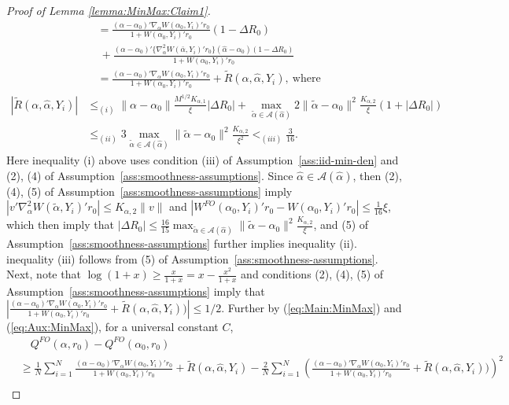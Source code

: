 \documentclass[11pt]{article}
\begin{document}
\begin{proof}[Proof of Lemma \ref{lemma:MinMax:Claim1}]
\begin{equation}
\begin{array}{rl}
&\displaystyle = \frac{(\alpha - \alpha_0)'\nabla_\alpha W(\alpha_0,Y_i)'r_0}{1+W(\alpha_0,Y_i)'r_0}(1-\Delta R_0) \\
&\ \displaystyle +\frac{(\alpha-\alpha_0)'\{\nabla_\alpha^2 W(\bar{\alpha},Y_i)'r_0\}(\hat\alpha-\alpha_0)(1-\Delta R_0)}{1+W(\alpha_0,Y_i)'r_0}\\
&\displaystyle = \frac{(\alpha - \alpha_0)'\nabla_\alpha W(\alpha_0,Y_i)'r_0}{1+W(\alpha_0,Y_i)'r_0} +\widetilde R(\alpha,\hat\alpha,Y_i),\ \mbox{where}
\end{array}
\end{equation}
$$\begin{array}{rl}
|\widetilde R(\alpha,\hat\alpha,Y_i)| &\displaystyle\leq_{(i)}  \|\alpha-\alpha_0\| \frac{M^{1/2}K_{\alpha,1}}{\xi} |\Delta R_0| +\max_{\tilde\alpha \in \mathcal{A}(\hat\alpha)} 2\|\tilde\alpha-\alpha_0\|^2 \frac{K_{\alpha,2}}{\xi} (1+|\Delta R_0|)\\
&\displaystyle\leq_{(ii)} 3\max_{\tilde\alpha \in \mathcal{A}(\hat\alpha)} \|\tilde\alpha-\alpha_0\|^2 \frac{K_{\alpha,2}}{\xi^2}<_{(iii)}\frac{3}{16}.
\end{array}$$
Here inequality (i) above uses condition (iii) of Assumption~\ref{ass:iid-min-den} and (2), (4) of Assumption~\ref{ass:smoothness-assumptions}. Since $\hat{\alpha}\in\mathcal{A}(\hat{\alpha})$, then (2), (4), (5) of Assumption~\ref{ass:smoothness-assumptions} imply $|v'\nabla_\alpha^2 W(\tilde\alpha,Y_i)'r_0| \leq K_{\alpha,2}\|v\| $ and $ | W^{FO}(\alpha_0,Y_i)'r_0 - W(\alpha_0,Y_i)'r_0| \leq \frac{1}{16} \xi$, which then imply that $|\Delta R_0|\leq \frac{16}{15}\max_{\tilde \alpha \in \mathcal{A}(\hat \alpha)} \|\tilde\alpha-\alpha_0\|^2 \frac{K_{\alpha,2}}{\xi}$, and (5) of Assumption~\ref{ass:smoothness-assumptions} further implies inequality (ii). inequality (iii) follows from (5) of Assumption~\ref{ass:smoothness-assumptions}. Next, note that $\log(1+x)\geq \frac{x}{1+x} = x - \frac{x^2}{1+x}$ and conditions (2), (4), (5) of Assumption~\ref{ass:smoothness-assumptions} imply that $\left| \frac{(\alpha - \alpha_0)'\nabla_\alpha W(\alpha_0,Y_i)'r_0}{1+W(\alpha_0,Y_i)'r_0} +\widetilde R(\alpha,\hat\alpha,Y_i))\right| \leq 1/2$. Further by (\ref{eq:Main:MinMax}) and (\ref{eq:Aux:MinMax}), for a universal constant $C$,
$$\begin{array}{rl}
&\quad Q^{FO}(\alpha,r_0)-Q^{FO}(\alpha_0,r_0) \\
&\displaystyle \geq  \frac{1}{N}\sum_{i=1}^N \frac{(\alpha - \alpha_0)'\nabla_\alpha W(\alpha_0,Y_i)'r_0}{1+W(\alpha_0,Y_i)'r_0} +\widetilde R(\alpha,\hat\alpha,Y_i) - \!\frac{2}{N}\sum_{i=1}^N \left(\frac{(\alpha - \alpha_0)'\nabla_\alpha W(\alpha_0,Y_i)'r_0}{1+W(\alpha_0,Y_i)'r_0} +\widetilde R(\alpha,\hat\alpha,Y_i))\right)^2 \\

\end{array}$$
\end{proof}
\end{document}
